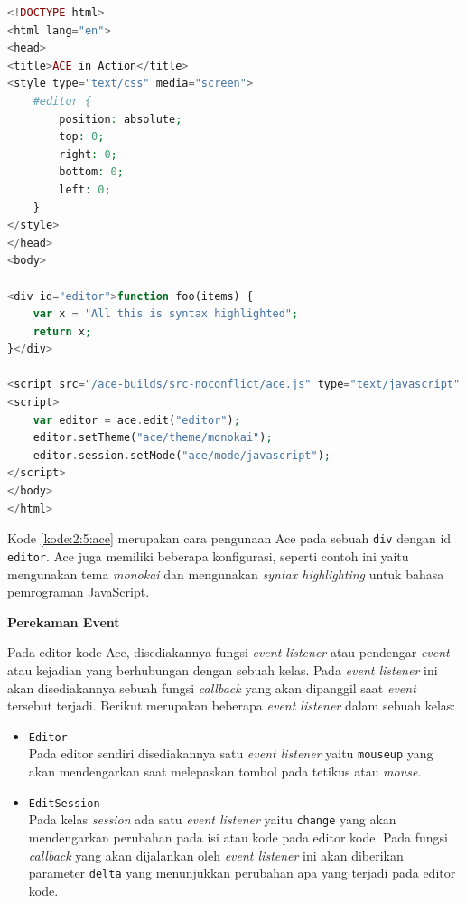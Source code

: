 \documentclass[a4paper,twoside]{article}
\begin{document}
\begin{enumerate}
	      \begin{lstlisting}[language={php}, caption={Contoh kode pengunaan Ace}, label={kode:2:5:ace}]
<!DOCTYPE html>
<html lang="en">
<head>
<title>ACE in Action</title>
<style type="text/css" media="screen">
	#editor { 
		position: absolute;
		top: 0;
		right: 0;
		bottom: 0;
		left: 0;
	}
</style>
</head>
<body>

<div id="editor">function foo(items) {
	var x = "All this is syntax highlighted";
	return x;
}</div>
	
<script src="/ace-builds/src-noconflict/ace.js" type="text/javascript" charset="utf-8"></script>
<script>
	var editor = ace.edit("editor");
	editor.setTheme("ace/theme/monokai");
	editor.session.setMode("ace/mode/javascript");
</script>
</body>
</html>
\end{lstlisting}

	      Kode \ref{kode:2:5:ace} merupakan cara pengunaan Ace pada sebuah \texttt{div} dengan id \texttt{editor}. Ace juga memiliki beberapa konfigurasi, seperti contoh ini yaitu mengunakan tema \textit{monokai} dan mengunakan \textit{syntax highlighting} untuk bahasa pemrograman JavaScript.

	      \vspace{0.25cm}
	      \textbf{\Large Perekaman Event}
	      \vspace{0.1cm}

	      Pada editor kode Ace, disediakannya fungsi \textit{event listener} atau pendengar \textit{event} atau kejadian yang berhubungan dengan sebuah kelas. Pada \textit{event listener} ini akan disediakannya sebuah fungsi \textit{callback} yang akan dipanggil saat \textit{event} tersebut terjadi. Berikut merupakan beberapa \textit{event listener} dalam sebuah kelas:

	      \begin{itemize}
		      \item \verb|Editor| \\
		            Pada editor sendiri disediakannya satu \textit{event listener} yaitu \verb|mouseup| yang akan mendengarkan saat melepaskan tombol pada tetikus atau \textit{mouse}.

		      \item \verb|EditSession| \\
		            Pada kelas \textit{session} ada satu \textit{event listener} yaitu \verb|change| yang akan mendengarkan perubahan pada isi atau kode pada editor kode. Pada fungsi \textit{callback} yang akan dijalankan oleh \textit{event listener} ini akan diberikan parameter \verb|delta| yang menunjukkan perubahan apa yang terjadi pada editor kode.


\end{itemize}
\end{enumerate}
\end{document}
